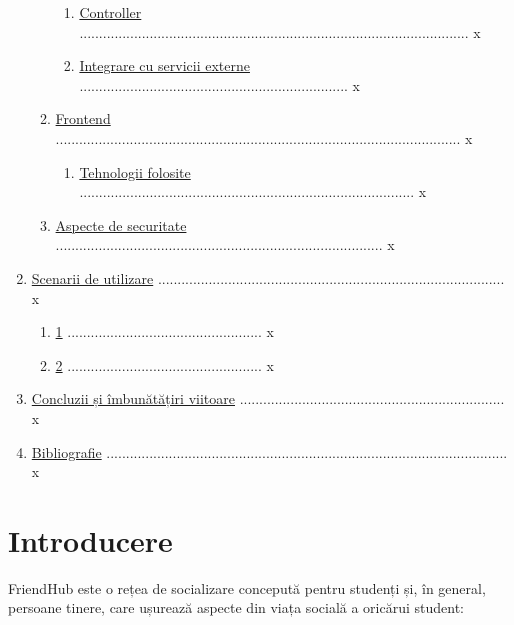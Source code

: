 \documentclass{article}
\begin{document}
\begin{enumerate}[itemsep=0.1ex,parsep=0.1ex,leftmargin=0cm]
\begin{enumerate}[label*=\arabic*.,ref=\theenumi.\arabic*,itemsep=0.1ex,parsep=0.1ex,leftmargin=0.3cm]
\begin{enumerate}[label*=\arabic*.,ref=\theenumi.\theenumi.\arabic*,itemsep=0.1ex,parsep=0.1ex,leftmargin=0.3cm]
        \item \hyperref[Controller]{Controller} .................................................................................................... x
        \item \hyperref[Integrare cu servicii externe]{Integrare cu servicii externe} ..................................................................... x
        \end{enumerate}
        \item \hyperref[Frontend]{Frontend} ........................................................................................................ x
        \begin{enumerate}[label*=\arabic*.,ref=\theenumi.\theenumi.\arabic*,itemsep=0.1ex,parsep=0.1ex,leftmargin=0.3cm]
        \item \hyperref[Frontend-tehnologii]{Tehnologii folosite} ...................................................................................... x
        \end{enumerate}
        \item \hyperref[Aspecte de securitate]{Aspecte de securitate} .................................................................................... x
    \end{enumerate}
    \item \hyperref[Scenarii de utilizare]{Scenarii de utilizare} ......................................................................................... x
    \begin{enumerate}[label*=\arabic*.,ref=\theenumi.\arabic*,itemsep=0.1ex,parsep=0.1ex,leftmargin=0.3cm]
        \item \hyperref[Scenarii de utilizare 1]{1} .................................................. x
        \item \hyperref[Scenarii de utilizare 2]{2} .................................................. x
    \end{enumerate}
    \item \hyperref[Concluzii și îmbunătățiri viitoare]{Concluzii și îmbunătățiri viitoare} .................................................................... x
    \item \hyperref[Bibliografie]{Bibliografie} ....................................................................................................... x
\end{enumerate}
\newpage

\section{Introducere}
\label{Introducere}
FriendHub este o rețea de socializare concepută pentru studenți și, în general, persoane tinere, care ușurează aspecte din viața socială a oricărui student: 
\end{document}
